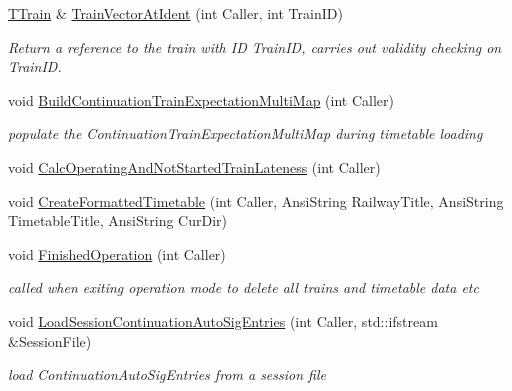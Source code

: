 \begin{DoxyCompactItemize}
\mbox{\label{class_t_train_controller_a4d5de42d6e9e92191241963599581210}} 
\mbox{\hyperlink{class_t_train}{T\+Train}} \& \mbox{\hyperlink{class_t_train_controller_a4d5de42d6e9e92191241963599581210}{Train\+Vector\+At\+Ident}} (int Caller, int Train\+ID)
\begin{DoxyCompactList}\small\item\em Return a reference to the train with ID Train\+ID, carries out validity checking on Train\+ID. \end{DoxyCompactList}\item 
\mbox{\label{class_t_train_controller_a0445987b1a355de3aef2c21b66d1ed8b}} 
void \mbox{\hyperlink{class_t_train_controller_a0445987b1a355de3aef2c21b66d1ed8b}{Build\+Continuation\+Train\+Expectation\+Multi\+Map}} (int Caller)
\begin{DoxyCompactList}\small\item\em populate the Continuation\+Train\+Expectation\+Multi\+Map during timetable loading \end{DoxyCompactList}\item 
void \mbox{\hyperlink{class_t_train_controller_aadffada34a23350d7773bc7735e423a1}{Calc\+Operating\+And\+Not\+Started\+Train\+Lateness}} (int Caller)
\item 
void \mbox{\hyperlink{class_t_train_controller_a4ab4b6a568064d27c65f0770e5a5ccd0}{Create\+Formatted\+Timetable}} (int Caller, Ansi\+String Railway\+Title, Ansi\+String Timetable\+Title, Ansi\+String Cur\+Dir)
\item 
\mbox{\label{class_t_train_controller_a07d3d10bf08d4e916b652d676c917335}} 
void \mbox{\hyperlink{class_t_train_controller_a07d3d10bf08d4e916b652d676c917335}{Finished\+Operation}} (int Caller)
\begin{DoxyCompactList}\small\item\em called when exiting operation mode to delete all trains and timetable data etc \end{DoxyCompactList}\item 
\mbox{\label{class_t_train_controller_ae30ca688c6c3672e98692a13f29b7a4b}} 
void \mbox{\hyperlink{class_t_train_controller_ae30ca688c6c3672e98692a13f29b7a4b}{Load\+Session\+Continuation\+Auto\+Sig\+Entries}} (int Caller, std\+::ifstream \&Session\+File)
\begin{DoxyCompactList}\small\item\em load Continuation\+Auto\+Sig\+Entries from a session file \end{DoxyCompactList}\item 

\end{DoxyCompactItemize}
